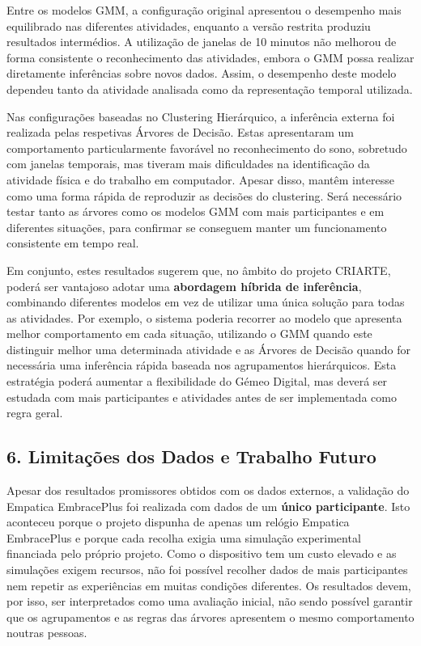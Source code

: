 Entre os modelos GMM, a configuração original apresentou o desempenho mais equilibrado nas diferentes atividades, enquanto a versão restrita produziu resultados intermédios. A utilização de janelas de 10 minutos não melhorou de forma consistente o reconhecimento das atividades, embora o GMM possa realizar diretamente inferências sobre novos dados. Assim, o desempenho deste modelo dependeu tanto da atividade analisada como da representação temporal utilizada.

Nas configurações baseadas no Clustering Hierárquico, a inferência externa foi realizada pelas respetivas Árvores de Decisão. Estas apresentaram um comportamento particularmente favorável no reconhecimento do sono, sobretudo com janelas temporais, mas tiveram mais dificuldades na identificação da atividade física e do trabalho em computador. Apesar disso, mantêm interesse como uma forma rápida de reproduzir as decisões do clustering. Será necessário testar tanto as árvores como os modelos GMM com mais participantes e em diferentes situações, para confirmar se conseguem manter um funcionamento consistente em tempo real.

Em conjunto, estes resultados sugerem que, no âmbito do projeto CRIARTE, poderá ser vantajoso adotar uma \textbf{abordagem híbrida de inferência}, combinando diferentes modelos em vez de utilizar uma única solução para todas as atividades. Por exemplo, o sistema poderia recorrer ao modelo que apresenta melhor comportamento em cada situação, utilizando o GMM quando este distinguir melhor uma determinada atividade e as Árvores de Decisão quando for necessária uma inferência rápida baseada nos agrupamentos hierárquicos. Esta estratégia poderá aumentar a flexibilidade do Gémeo Digital, mas deverá ser estudada com mais participantes e atividades antes de ser implementada como regra geral.

\subsection*{6. Limitações dos Dados e Trabalho Futuro}

Apesar dos resultados promissores obtidos com os dados externos, a validação do Empatica EmbracePlus foi realizada com dados de um \textbf{único participante}. Isto aconteceu porque o projeto dispunha de apenas um relógio Empatica EmbracePlus e porque cada recolha exigia uma simulação experimental financiada pelo próprio projeto. Como o dispositivo tem um custo elevado e as simulações exigem recursos, não foi possível recolher dados de mais participantes nem repetir as experiências em muitas condições diferentes. Os resultados devem, por isso, ser interpretados como uma avaliação inicial, não sendo possível garantir que os agrupamentos e as regras das árvores apresentem o mesmo comportamento noutras pessoas.

